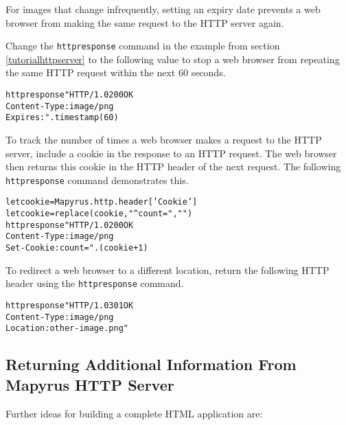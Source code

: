 For images that change infrequently, setting an expiry date prevents
a web browser from making the same request to the HTTP server again.

Change the \texttt{httpresponse} command in the example
from section \ref{tutorialhttpserver} to the following value to
stop a web browser from repeating the same HTTP request within
the next 60 seconds.

\begin{alltt}
httpresponse "HTTP/1.0 200 OK
Content-Type: image/png
Expires: " . timestamp(60)
\end{alltt}

To track the number of times a web browser makes a request to the
HTTP server, include a cookie in the response to an HTTP request.
The web browser then returns this cookie in the HTTP header of
the next request.  The following \texttt{httpresponse} command
demonstrates this.

\begin{alltt}
let cookie = Mapyrus.http.header['Cookie']
let cookie = replace(cookie, "^count=", "")
httpresponse "HTTP/1.0 200 OK
Content-Type: image/png
Set-Cookie: count=" . (cookie + 1)
\end{alltt}

To redirect a web browser to a different location,
return the following HTTP header using the \texttt{httpresponse}
command.

\begin{alltt}
httpresponse "HTTP/1.0 301 OK
Content-Type: image/png
Location: other-image.png"
\end{alltt}

\subsection{Returning Additional Information From Mapyrus HTTP Server}

Further ideas for building a complete HTML application are:

